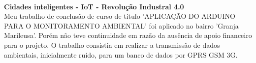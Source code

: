 \documentclass[12pt,a4paper,oneside,sumario=tradicional,brazil]{abntex2}
\begin{document}
	\
	
	\indent
	\textbf{{\large Cidades inteligentes - IoT - Revolução Industral 4.0}} \\
	\indent
	Meu trabalho de conclusão de curso de titulo 'APLICAÇÃO DO ARDUINO PARA O MONITORAMENTO AMBIENTAL' foi aplicado no bairro 'Granja Marileusa'. Porém não teve continuidade em razão da ausência de apoio financeiro para o projeto. O trabalho consistia em realizar a transmissão de dados ambientais, inicialmente ruído, para um banco de dados por GPRS GSM 3G. \\
	\indent

	\
	
	
\end{document}
